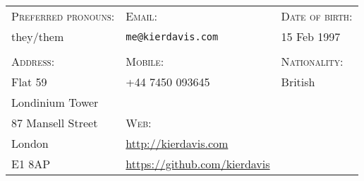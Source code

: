 \vspace{-1em}
\hrulefill
\vspace{1em}

{
  \newcommand{\h}[1]{\textsc{#1}:}
  \newcommand{\n}[1]{\hspace{.8em} #1}
  \begin{tabu} to \textwidth {X[1.4,l] X[2.3,l] X[1.4,l]}
    \h{Preferred pronouns} & \h{Email}                                 & \h{Date of birth}  \\
    \n{they/them}          & \n{\texttt{me@kierdavis.com}}             & \n{15 Feb 1997}    \\
                           &                                           &                    \\
    \h{Address}            & \h{Mobile}                                & \h{Nationality}    \\
    \n{Flat 59}            & \n{+44 7450 093645}                       & \n{British}        \\
    \n{Londinium Tower}    &                                           &                    \\
    \n{87 Mansell Street}  & \h{Web}                                   &                    \\
    \n{London}             & \n{\url{http://kierdavis.com}}            &                    \\
    \n{E1 8AP}             & \n{\url{https://github.com/kierdavis}}    &                    \\
  \end{tabu}
}

\hrulefill
